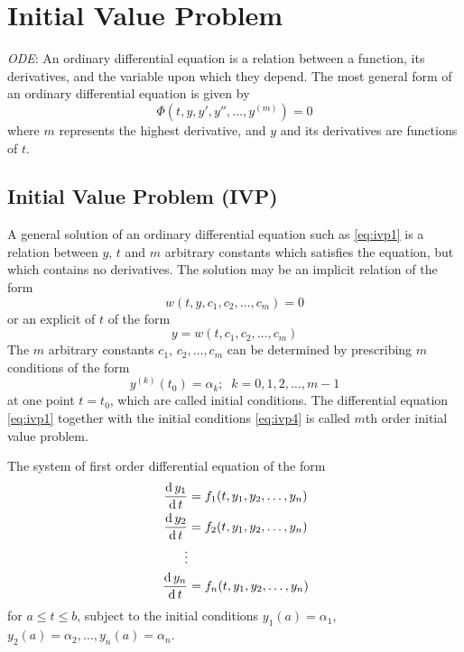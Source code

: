 \documentclass[../main-sheet.tex]{subfiles}
\begin{document}
\chapter{Initial Value Problem}
\emph{ODE}: An ordinary differential equation is a relation between a function, its derivatives, and the variable upon which they depend.
The most general form of an ordinary differential equation is given by
\begin{equation}
    \Phi(t,y,y',y'',\dots,y^{(m)})=0\label{eq:ivp1}
\end{equation}
where \(m\) represents the highest derivative, and \(y\) and its derivatives are functions of \(t\).

\section{Initial Value Problem (IVP)}
A general solution of an ordinary differential equation such as \eqref{eq:ivp1} is a relation between \(y\), \(t\) and \(m\) arbitrary constants which satisfies the equation, but which contains no derivatives.
The solution may be an implicit relation of the form
\begin{equation}
    w(t,y,c_1,c_2,\dots,c_m)=0\label{eq:ivp2}
\end{equation}
or an explicit of \(t\) of the form
\begin{equation}
    y=w(t,c_1,c_2,\dots,c_m) \label{eq:ivp3}
\end{equation}
The \(m\) arbitrary constants \(c_1\), \(c_2,\dots,c_m  \) can be determined by prescribing \(m \) conditions of the form 
\begin{equation}
    y^{(k)}(t_0)=\alpha_k;\;\;k=0,1,2,\dots,m-1 \label{eq:ivp4}
\end{equation}
at one point \(t=t_0\), which are called initial conditions. The differential equation \eqref{eq:ivp1} together with the initial conditions \eqref{eq:ivp4} is called \(m\)th order initial value problem.
\begin{note}
    The system of first order differential equation of the form 
    \begin{align*}
        \,\frac{\mathrm{d}\,y_1}{\mathrm{d}\,t}&=f_1(t,y_1,y_2,\dots,y_n)\\
        \,\frac{\mathrm{d}\,y_2}{\mathrm{d}\,t}&=f_2(t,y_1,y_2,\dots,y_n)\\
        \vdots&\\
        \,\frac{\mathrm{d}\,y_n}{\mathrm{d}\,t}&=f_n(t,y_1,y_2,\dots,y_n)
    \end{align*}
    for \(a\leq t\leq b\), subject to the initial conditions \(y_1(a)=\alpha_1\), \(y_2(a)=\alpha_2,\dots,y_n(a)=\alpha_n\).
\end{note}
\end{document}
